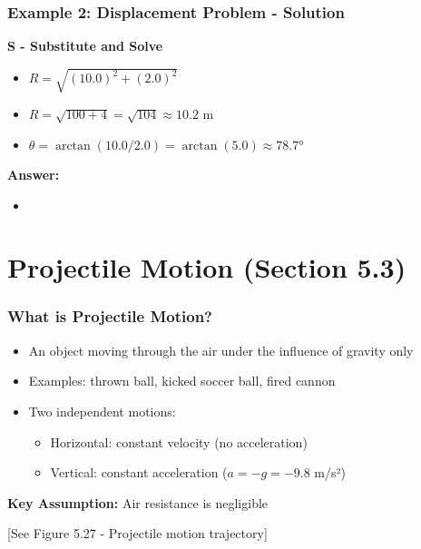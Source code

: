 \documentclass{beamer}
\begin{document}
\begin{frame}
\frametitle{Example 2: Displacement Problem - Solution}
\textbf{S - Substitute and Solve}
\begin{itemize}
\item $R = \sqrt{(10.0)^2 + (2.0)^2}$ \pause
\item $R = \sqrt{100 + 4} = \sqrt{104} \approx 10.2$ m \pause
\item $\theta = \arctan(10.0/2.0) = \arctan(5.0) \approx 78.7°$
\end{itemize}
\pause

\textbf{Answer:}
\begin{itemize}
\item {}
\end{itemize}
\end{frame}
\section{Projectile Motion (Section 5.3)}

\begin{frame}
\frametitle{What is Projectile Motion?}
\begin{itemize}
    \item An object moving through the air under the influence of gravity only \pause
    \item Examples: thrown ball, kicked soccer ball, fired cannon \pause
    \item Two independent motions:
    \begin{itemize}
        \item Horizontal: constant velocity (no acceleration) \pause
        \item Vertical: constant acceleration ($a = -g = -9.8$ m/s²)
    \end{itemize}
\end{itemize}
\pause
\vspace{0.3cm}
\textbf{Key Assumption:} Air resistance is negligible

\vspace{0.2cm}
\alert{[See Figure 5.27 - Projectile motion trajectory]}
\end{frame}
\end{document}

